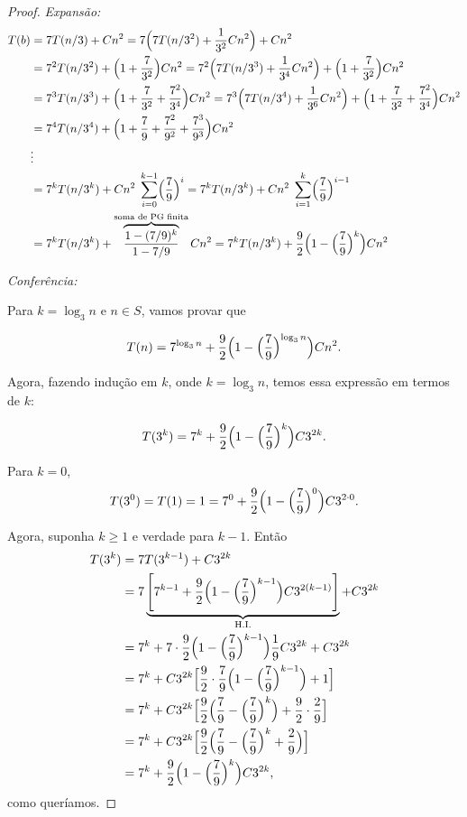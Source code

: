 \documentclass{article}
\begin{document}
\begin{proof}
\textit{Expansão: }
\begin{align*}
  T(b) &= 7 T(n/3) + Cn^2
  = 7 \Bigl( 7 T(n/3^2) + \frac{1}{3^2} Cn^2 \Bigr) + Cn^2 \\
  &= 7^2 T(n/3^2) + \Bigl(1 + \frac{7}{3^2}\Bigr) Cn^2
  = 7^2 \Bigl(7 T(n/3^3) + \frac{1}{3^4} Cn^2\Bigr) + \Bigl(1 + \frac{7}{3^2}\Bigr) Cn^2 \\
  &= 7^3 T(n/3^3) + \Bigl(1 + \frac{7}{3^2} + \frac{7^2}{3^4}\Bigr) Cn^2
  = 7^3 \Bigl( 7 T(n/3^4) + \frac{1}{3^6} Cn^2 \Bigr) + \Bigl(1 + \frac{7}{3^2} + \frac{7^2}{3^4}\Bigr) Cn^2 \\
  &= 7^4 T(n/3^4) + \Bigl(1 + \frac{7}{9} + \frac{7^2}{9^2} + \frac{7^3}{9^3}\Bigr) Cn^2 \\
  &\vdots \\
  &= 7^k T(n/3^k) + Cn^2 \; \sum_{i=0}^{k-1} \Bigl(\frac{7}{9}\Bigr)^i
  = 7^k T(n/3^k) + Cn^2 \; \sum_{i=1}^{k} \Bigl(\frac{7}{9}\Bigr)^{i-1} \\
  &= 7^k T(n/3^k) + \overbrace{\frac{1 - (7/9)^{k}}{1 - 7/9}}^\text{soma de PG finita} Cn^2 
  = 7^k T(n/3^k) + \frac{9}{2} \Bigl(1 - \Bigl(\frac{7}{9}\Bigr)^{k}\Bigr) Cn^2 
\end{align*}

\textit{Conferência: }

Para $k = \log_3 n$ e $n \in S$, vamos provar que

\[ T(n) = 7^{\log_3 n} + \frac{9}{2} \Bigl(1 - \Bigl(\frac{7}{9}\Bigr)^{\log_3 n}\Bigr) Cn^2 . \]

Agora, fazendo indução em $k$, onde $k = \log_3 n$, temos essa expressão em termos de $k$:

\[ T(3^k) = 7^k + \frac{9}{2}\Bigl(1 - \Bigl(\frac{7}{9}\Bigr)^{k}\Bigr) C3^{2k} .\]

Para $k=0$,
\[ T(3^0) = T(1) = 1 = 7^0 + \frac{9}{2} \Bigl(1 - \Bigl(\frac{7}{9}\Bigr)^{0}\Bigr) C3^{2\cdot 0}. \]

Agora, suponha $k \geq 1$ e verdade para $k-1$. Então
\begin{align*}
  T(3^k) &= 7 T(3^{k-1}) + C3^{2k} \\
  &= 7 \underbrace{\Biggl[ 7^{k-1} + \frac{9}{2}\Bigl(1 - \Bigl(\frac{7}{9}\Bigr)^{k-1}\Bigr) C3^{2(k-1)}\Biggr]}_\text{H.I.} + C3^{2k} \\
  &= 7^k + 7 \cdot \frac{9}{2}\Bigl(1 - \Bigl(\frac{7}{9}\Bigr)^{k-1}\Bigr) \frac{1}{9}C3^{2k} + C3^{2k} \\
  &= 7^k + C3^{2k} \Bigl[\frac{9}{2}\cdot\frac{7}{9}\Bigl(1 - \Bigl(\frac{7}{9}\Bigr)^{k-1}\Bigr) + 1\Bigr] \\
  &= 7^k + C3^{2k} \Bigl[\frac{9}{2}\Bigl(\frac{7}{9} - \Bigl(\frac{7}{9}\Bigr)^{k}\Bigr) + \frac{9}{2}\cdot\frac{2}{9}\Bigr] \\
  &= 7^k + C3^{2k} \Bigl[\frac{9}{2}\Bigl(\frac{7}{9} - \Bigl(\frac{7}{9}\Bigr)^{k} + \frac{2}{9}\Bigr)\Bigr] \\
  &= 7^k + \frac{9}{2}\Bigl(1 - \Bigl(\frac{7}{9}\Bigr)^{k}\Bigr) C3^{2k} ,
\end{align*}
como queríamos.

\end{proof}
\end{document}
